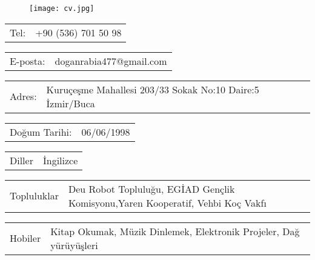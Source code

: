 \documentclass[10pt,A4]{article}
\newcommand{\tzlarrow}{(0,0) -- (0.2,0) -- (0.3,0.2) -- (0.2,0.4) -- (0,0.4) -- (0.1,0.2) -- cycle;}
\newcommand{\larrow}[1]
{\begin{tikzpicture}[scale=0.58]
	 \filldraw[fill=#1!100,draw=#1!100!black]  \tzlarrow
 \end{tikzpicture}
}
\newcommand{\metasection}[2]
{
\begin{tabular*}{1\textwidth}{p{2.7cm} p{11cm}}
\larrow{bgcol}	\normalsize{\textcolor{sectcol}{#1}}&#2\\[10pt]
\end{tabular*}
}
\begin{document}
\pagestyle{fancy}	


\vspace{1pt}


\hspace{-0.25\linewidth}\colorbox{bgcol}{}


\vspace{10pt}
\begin{figure}[H]
\hspace{0.8\linewidth}
	\texttt{[image: cv.jpg]}	%
\end{figure}



\vspace{-140pt}
\metasection{Tel:}{+90 (536) 701 50 98 }
\metasection{E-posta:}{doganrabia477@gmail.com} 
\metasection{Adres:}{Kuruçeşme Mahallesi 203/33 Sokak No:10 Daire:5 İzmir/Buca}
\metasection{Doğum Tarihi:}{06/06/1998}
\metasection{Diller}{İngilizce}
\metasection{Topluluklar}{Deu Robot Topluluğu, EGİAD Gençlik Komisyonu,Yaren Kooperatif, Vehbi Koç Vakfı}
\metasection{Hobiler}{Kitap Okumak, Müzik Dinlemek, Elektronik Projeler, Dağ yürüyüşleri}
\end{document}
